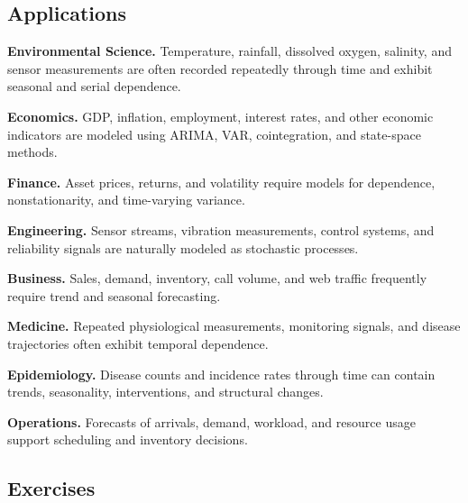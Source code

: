 \subsection{Applications}
\label{subsec:time-series-applications}

\begin{applicationbox}

\textbf{Environmental Science.}
Temperature, rainfall, dissolved oxygen, salinity, and sensor
measurements are often recorded repeatedly through time and exhibit
seasonal and serial dependence.

\medskip

\textbf{Economics.}
GDP, inflation, employment, interest rates, and other economic indicators
are modeled using ARIMA, VAR, cointegration, and state-space methods.

\medskip

\textbf{Finance.}
Asset prices, returns, and volatility require models for dependence,
nonstationarity, and time-varying variance.

\medskip

\textbf{Engineering.}
Sensor streams, vibration measurements, control systems, and reliability
signals are naturally modeled as stochastic processes.

\medskip

\textbf{Business.}
Sales, demand, inventory, call volume, and web traffic frequently require
trend and seasonal forecasting.

\medskip

\textbf{Medicine.}
Repeated physiological measurements, monitoring signals, and disease
trajectories often exhibit temporal dependence.

\medskip

\textbf{Epidemiology.}
Disease counts and incidence rates through time can contain trends,
seasonality, interventions, and structural changes.

\medskip

\textbf{Operations.}
Forecasts of arrivals, demand, workload, and resource usage support
scheduling and inventory decisions.

\end{applicationbox}

\subsection{Exercises}
\label{subsec:time-series-exercises}

